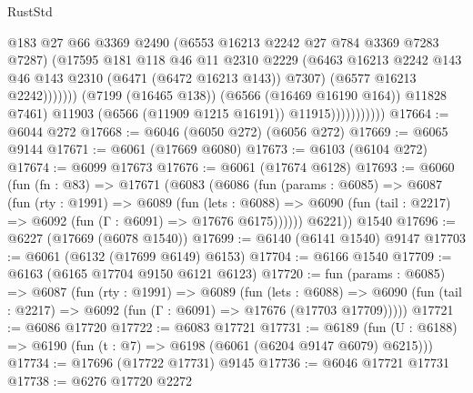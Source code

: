 \begin{lexlean}{RustStd}
\begin{coremodule}
                                      @183
                                      @27
                                      @66
                                      @3369
                                      @2490
                                      (@6553 @16213 @2242 @27 @784 @3369 @7283 @7287)
                                      (@17595
                                        @181
                                        @118
                                        @46
                                        @11
                                        @2310
                                        @2229
                                        (@6463
                                          @16213
                                          @2242
                                          @143
                                          @46
                                          @143
                                          @2310
                                          (@6471 (@6472 @16213 @143))
                                          @7307)
                                        (@6577 @16213 @2242)))))))
                            (@7199 (@16465 @138))
                            (@6566 (@16469 @16190 @164))
                            @11828
                            @7461)
                          @11903
                          (@6566 (@11909 @1215 @16191))
                          @11915)))))))))))
@17664 := @6044 @272
@17668 := @6046 (@6050 @272) (@6056 @272)
@17669 := @6065 @9144
@17671 := @6061 (@17669 @6080)
@17673 := @6103 (@6104 @272)
@17674 := @6099 @17673
@17676 := @6061 (@17674 @6128)
@17693 := @6060
    (fun (fn : @83) =>
    @17671
      (@6083
        (@6086
          (fun (params : @6085) =>
          @6087
            (fun (rty : @1991) =>
            @6089
              (fun (lets : @6088) =>
              @6090 (fun (tail : @2217) => @6092 (fun (Γ : @6091) => @17676 @6175))))))
        @6221))
    @1540
@17696 := @6227 (@17669 (@6078 @1540))
@17699 := @6140 (@6141 @1540) @9147
@17703 := @6061 (@6132 (@17699 @6149) @6153)
@17704 := @6166 @1540
@17709 := @6163 (@6165 @17704 @9150 @6121 @6123)
@17720 := fun (params : @6085) =>
  @6087
    (fun (rty : @1991) =>
    @6089
      (fun (lets : @6088) =>
      @6090 (fun (tail : @2217) => @6092 (fun (Γ : @6091) => @17676 (@17703 @17709)))))
@17721 := @6086 @17720
@17722 := @6083 @17721
@17731 := @6189 (fun (U : @6188) => @6190 (fun (t : @7) => @6198 (@6061 (@6204 @9147 @6079) @6215)))
@17734 := @17696 (@17722 @17731) @9145
@17736 := @6046 @17721 @17731
@17738 := @6276 @17720 @2272

\end{coremodule}
\end{lexlean}
